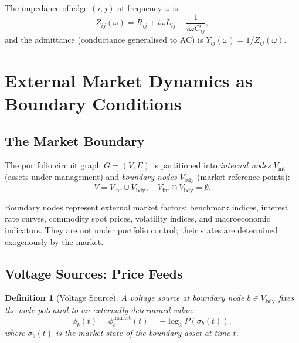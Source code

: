 \documentclass[twocolumn,10pt]{article}
\newtheorem{definition}[theorem]{Definition}
\theoremstyle{remark}
\begin{document}
The impedance of edge $(i,j)$ at frequency $\omega$ is:
\begin{equation}
    Z_{ij}(\omega) = R_{ij} + i\omega L_{ij} + \frac{1}{i\omega C_{ij}},
    \label{eq:impedance}
\end{equation}
and the admittance (conductance generalised to AC) is $Y_{ij}(\omega) = 1/Z_{ij}(\omega)$.


\section{External Market Dynamics as Boundary Conditions}
\label{sec:external_market}

\subsection{The Market Boundary}

The portfolio circuit graph $G = (V, E)$ is partitioned into \emph{internal nodes} $V_{\text{int}}$ (assets under management) and \emph{boundary nodes} $V_{\text{bdy}}$ (market reference points):
\begin{equation}
    V = V_{\text{int}} \cup V_{\text{bdy}}, \quad V_{\text{int}} \cap V_{\text{bdy}} = \emptyset.
    \label{eq:partition_nodes}
\end{equation}

Boundary nodes represent external market factors: benchmark indices, interest rate curves, commodity spot prices, volatility indices, and macroeconomic indicators.  They are not under portfolio control; their states are determined exogenously by the market.

\subsection{Voltage Sources: Price Feeds}

\begin{definition}[Voltage Source]
\label{def:voltage_source}
A \emph{voltage source} at boundary node $b \in V_{\text{bdy}}$ fixes the node potential to an externally determined value:
\begin{equation}
    \phi_b(t) = \phi_b^{\text{market}}(t) = -\log_2 P(\sigma_b(t)),
    \label{eq:voltage_source}
\end{equation}
where $\sigma_b(t)$ is the market state of the boundary asset at time $t$.
\end{definition}
\end{document}
